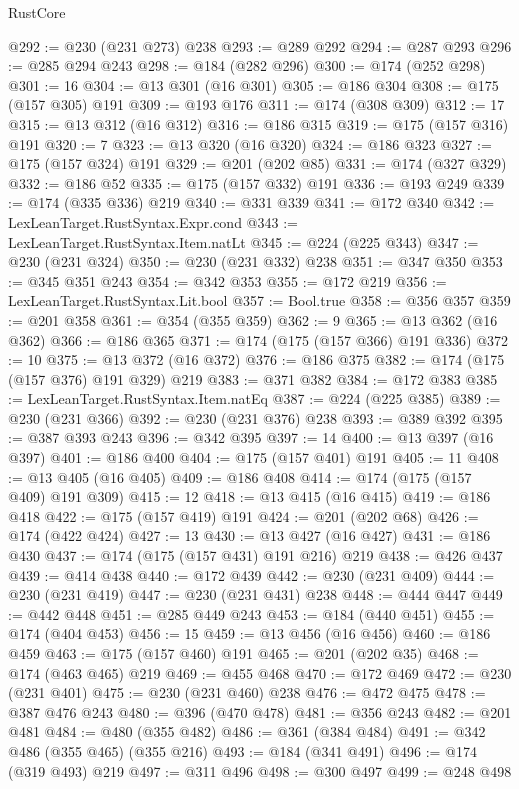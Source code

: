 \begin{lexlean}{RustCore}
\begin{coremodule}
@292 := @230 (@231 @273) @238
@293 := @289 @292
@294 := @287 @293
@296 := @285 @294 @243
@298 := @184 (@282 @296)
@300 := @174 (@252 @298)
@301 := 16
@304 := @13 @301 (@16 @301)
@305 := @186 @304
@308 := @175 (@157 @305) @191
@309 := @193 @176
@311 := @174 (@308 @309)
@312 := 17
@315 := @13 @312 (@16 @312)
@316 := @186 @315
@319 := @175 (@157 @316) @191
@320 := 7
@323 := @13 @320 (@16 @320)
@324 := @186 @323
@327 := @175 (@157 @324) @191
@329 := @201 (@202 @85)
@331 := @174 (@327 @329)
@332 := @186 @52
@335 := @175 (@157 @332) @191
@336 := @193 @249
@339 := @174 (@335 @336) @219
@340 := @331 @339
@341 := @172 @340
@342 := LexLeanTarget.RustSyntax.Expr.cond
@343 := LexLeanTarget.RustSyntax.Item.natLt
@345 := @224 (@225 @343)
@347 := @230 (@231 @324)
@350 := @230 (@231 @332) @238
@351 := @347 @350
@353 := @345 @351 @243
@354 := @342 @353
@355 := @172 @219
@356 := LexLeanTarget.RustSyntax.Lit.bool
@357 := Bool.true
@358 := @356 @357
@359 := @201 @358
@361 := @354 (@355 @359)
@362 := 9
@365 := @13 @362 (@16 @362)
@366 := @186 @365
@371 := @174 (@175 (@157 @366) @191 @336)
@372 := 10
@375 := @13 @372 (@16 @372)
@376 := @186 @375
@382 := @174 (@175 (@157 @376) @191 @329) @219
@383 := @371 @382
@384 := @172 @383
@385 := LexLeanTarget.RustSyntax.Item.natEq
@387 := @224 (@225 @385)
@389 := @230 (@231 @366)
@392 := @230 (@231 @376) @238
@393 := @389 @392
@395 := @387 @393 @243
@396 := @342 @395
@397 := 14
@400 := @13 @397 (@16 @397)
@401 := @186 @400
@404 := @175 (@157 @401) @191
@405 := 11
@408 := @13 @405 (@16 @405)
@409 := @186 @408
@414 := @174 (@175 (@157 @409) @191 @309)
@415 := 12
@418 := @13 @415 (@16 @415)
@419 := @186 @418
@422 := @175 (@157 @419) @191
@424 := @201 (@202 @68)
@426 := @174 (@422 @424)
@427 := 13
@430 := @13 @427 (@16 @427)
@431 := @186 @430
@437 := @174 (@175 (@157 @431) @191 @216) @219
@438 := @426 @437
@439 := @414 @438
@440 := @172 @439
@442 := @230 (@231 @409)
@444 := @230 (@231 @419)
@447 := @230 (@231 @431) @238
@448 := @444 @447
@449 := @442 @448
@451 := @285 @449 @243
@453 := @184 (@440 @451)
@455 := @174 (@404 @453)
@456 := 15
@459 := @13 @456 (@16 @456)
@460 := @186 @459
@463 := @175 (@157 @460) @191
@465 := @201 (@202 @35)
@468 := @174 (@463 @465) @219
@469 := @455 @468
@470 := @172 @469
@472 := @230 (@231 @401)
@475 := @230 (@231 @460) @238
@476 := @472 @475
@478 := @387 @476 @243
@480 := @396 (@470 @478)
@481 := @356 @243
@482 := @201 @481
@484 := @480 (@355 @482)
@486 := @361 (@384 @484)
@491 := @342 @486 (@355 @465) (@355 @216)
@493 := @184 (@341 @491)
@496 := @174 (@319 @493) @219
@497 := @311 @496
@498 := @300 @497
@499 := @248 @498

\end{coremodule}
\end{lexlean}
